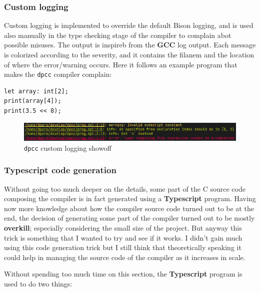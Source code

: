 \documentclass[a4paper]{article}
\begin{document}
\subsubsection{Custom logging}
Custom logging is implemented to override the default Bison logging, and is used also manually in the type checking
stage of the compiler to complain abot possible misuses.
The output is inspireb from the \textbf{GCC} log output. Each message is colorized according to the severity, and
it contains the filanem and the location of where the error/warning occurs. Here it follows an example program that makes the \texttt{dpcc} compiler complain:
\begin{lstlisting}[language=DPL]
let array: int[2];
print(array[4]);
print(3.5 << 8);
\end{lstlisting}
    \begin{figure}[H]
        \centering
        \includegraphics[width=\linewidth]{imgs/log.png}
        \caption{\texttt{dpcc} custom logging showoff}
    \end{figure}


\subsubsection{Typescript code generation}

Without going too much deeper on the details, some part of the C source code composing the compiler is in fact
generated using a \textbf{Typescript} program. Having now more knowledge about how the compiler source code
turned out to be at the end, the decision of generating some part of the compiler turned
out to be mostly \textbf{overkill}; especially considering the small size of the project. But anyway this
trick is something that I wanted to try and see if it works. I didn't gain much using this code generation
trick but I still think that theoretically speaking it could help in managing
the source code of the compiler as it increases in scale.

Without spending too much time on this section, the \textbf{Typescript} program is used to do two things:
\end{document}

